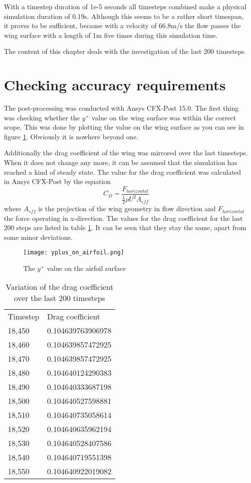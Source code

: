 With a timestep duration of 1e-5 seconds all timesteps combined make a physical simulation duration of 0.19s. Although this seems to be a rather short timespan, it proves to be sufficient, because with a velocity of 66.8m/s the flow passes the wing surface with a length of 1m five times during this simulation time. 

The content of this chapter deals with the investigation of the last 200 timesteps.
\section{Checking accuracy requirements}
The post-processing was conducted with Ansys CFX-Post 15.0. The first thing was checking whether the $y^+$ value on the wing surface was within the correct scope. This was done by plotting the value on the wing surface as you can see in figure \ref{fig:yplus}. Obviously it is nowhere beyond one.

Additionally the drag coefficient of the wing was mirrored over the last timesteps. When it does not change any more, it can be assumed that the simulation has reached a kind of steady state. The value for the drag coefficient was calculated in Ansys CFX-Post by the equation
\begin{equation}
C_D = \frac{F_{horizontal}}{\frac{1}{2} \rho U^2 A_{eff}}
\end{equation}
where $A_{eff}$ is the projection of the wing geometry in flow direction and $F_{horizontal}$ the force operating in x-direction.
The values for the drag coefficient for the last 200 steps are listed in table \ref{tab:htc_values}. It can be seen that they stay the same, apart from some minor deviations.
\begin{figure}[ht]
\centering
\texttt{[image: yplus\_on\_airfoil.png]}
\caption{The $y^+$ value on the airfoil surface}
\label{fig:yplus}
\end{figure}

\begin{table}[ht]
\centering
\caption{Variation of the drag coefficient over the last 200 timesteps}
\label{tab:htc_values}
\begin{tabular}{ll}
Timestep&Drag coefficient\\
18,450&0.104639763906978\\
18,460&0.104639857472925\\
18,470&0.104639857472925\\
18,480&0.104640124290383\\
18,490&0.104640333687198\\
18,500&0.104640527598881\\
18,510&0.104640735058614\\
18,520&0.104640635962194\\
18,530&0.104640528407586\\
18,540&0.104640719551398\\
18,550&0.104640922019082\\
\end{tabular}
\end{table}

